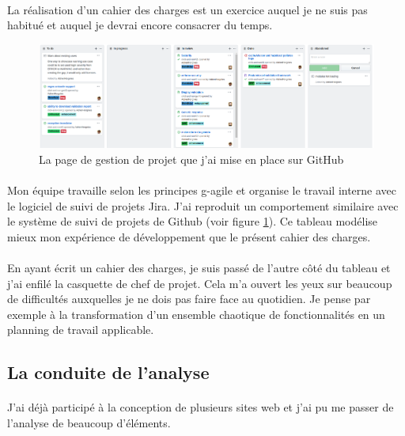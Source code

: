 \paragraph{}
La réalisation d'un cahier des charges est un exercice auquel je ne suis pas habitué et auquel je devrai encore consacrer du temps.

\begin{figure}[ht]
    \centering
    \includegraphics[width=1\textwidth]{images/github-project.png}
    \caption{La page de gestion de projet que j'ai mise en place sur GitHub}
    \label{fig:github-project}
\end{figure}

\paragraph{}
Mon équipe travaille selon les principes \gls{g-agile} et organise le travail interne avec le logiciel de suivi de projets Jira.
J'ai reproduit un comportement similaire avec le système de suivi de projets de Github (voir figure \ref{fig:github-project}).
Ce tableau modélise mieux mon expérience de développement que le présent cahier des charges.

\paragraph{}
En ayant écrit un cahier des charges, je suis passé de l'autre côté du tableau et j'ai enfilé la casquette de chef de projet.
Cela m'a ouvert les yeux sur beaucoup de difficultés auxquelles je ne dois pas faire face au quotidien.
Je pense par exemple à la transformation d'un ensemble chaotique de fonctionnalités en un planning de travail applicable.

\subsection{La conduite de l'analyse}
\label{subsec:analyse-is-hard}

\paragraph{}
J'ai déjà participé à la conception de plusieurs sites web et j'ai pu me passer de l'analyse de beaucoup d'éléments.

